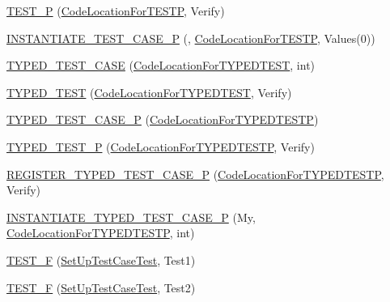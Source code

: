\begin{DoxyCompactItemize}
\hyperlink{namespacetesting_af05768b7e2f14652d2c4f274ba1a5544}{T\+E\+S\+T\+\_\+P} (\hyperlink{classtesting_1_1_code_location_for_t_e_s_t_p}{Code\+Location\+For\+T\+E\+S\+TP}, Verify)
\item 
\hyperlink{namespacetesting_a5b049e97e9082df909e4a0f740ff5d02}{I\+N\+S\+T\+A\+N\+T\+I\+A\+T\+E\+\_\+\+T\+E\+S\+T\+\_\+\+C\+A\+S\+E\+\_\+P} (, \hyperlink{classtesting_1_1_code_location_for_t_e_s_t_p}{Code\+Location\+For\+T\+E\+S\+TP}, Values(0))
\item 
\hyperlink{namespacetesting_af0459cc6cdfbbae821caf802c7f2bb72}{T\+Y\+P\+E\+D\+\_\+\+T\+E\+S\+T\+\_\+\+C\+A\+SE} (\hyperlink{classtesting_1_1_code_location_for_t_y_p_e_d_t_e_s_t}{Code\+Location\+For\+T\+Y\+P\+E\+D\+T\+E\+ST}, int)
\item 
\hyperlink{namespacetesting_a400c572f732b06e836d6b3a5adfc4cf7}{T\+Y\+P\+E\+D\+\_\+\+T\+E\+ST} (\hyperlink{classtesting_1_1_code_location_for_t_y_p_e_d_t_e_s_t}{Code\+Location\+For\+T\+Y\+P\+E\+D\+T\+E\+ST}, Verify)
\item 
\hyperlink{namespacetesting_a439eefbc85668f74fd9e0c2cb7c7d0b0}{T\+Y\+P\+E\+D\+\_\+\+T\+E\+S\+T\+\_\+\+C\+A\+S\+E\+\_\+P} (\hyperlink{classtesting_1_1_code_location_for_t_y_p_e_d_t_e_s_t_p}{Code\+Location\+For\+T\+Y\+P\+E\+D\+T\+E\+S\+TP})
\item 
\hyperlink{namespacetesting_a3f3fbbc7ecc23117307b81deb8f4cfac}{T\+Y\+P\+E\+D\+\_\+\+T\+E\+S\+T\+\_\+P} (\hyperlink{classtesting_1_1_code_location_for_t_y_p_e_d_t_e_s_t_p}{Code\+Location\+For\+T\+Y\+P\+E\+D\+T\+E\+S\+TP}, Verify)
\item 
\hyperlink{namespacetesting_a9fc96ebb1c0e7db169c4a5697c903f56}{R\+E\+G\+I\+S\+T\+E\+R\+\_\+\+T\+Y\+P\+E\+D\+\_\+\+T\+E\+S\+T\+\_\+\+C\+A\+S\+E\+\_\+P} (\hyperlink{classtesting_1_1_code_location_for_t_y_p_e_d_t_e_s_t_p}{Code\+Location\+For\+T\+Y\+P\+E\+D\+T\+E\+S\+TP}, Verify)
\item 
\hyperlink{namespacetesting_a111c1dea1140652727ab97ddc13eb045}{I\+N\+S\+T\+A\+N\+T\+I\+A\+T\+E\+\_\+\+T\+Y\+P\+E\+D\+\_\+\+T\+E\+S\+T\+\_\+\+C\+A\+S\+E\+\_\+P} (My, \hyperlink{classtesting_1_1_code_location_for_t_y_p_e_d_t_e_s_t_p}{Code\+Location\+For\+T\+Y\+P\+E\+D\+T\+E\+S\+TP}, int)
\item 
\hyperlink{namespacetesting_a01e948eb5427d31f70eafaf472e2bfa8}{T\+E\+S\+T\+\_\+F} (\hyperlink{classtesting_1_1_set_up_test_case_test}{Set\+Up\+Test\+Case\+Test}, Test1)
\item 
\hyperlink{namespacetesting_a8fc2e448ce96e4da357a2129d49e86e3}{T\+E\+S\+T\+\_\+F} (\hyperlink{classtesting_1_1_set_up_test_case_test}{Set\+Up\+Test\+Case\+Test}, Test2)

\end{DoxyCompactItemize}
